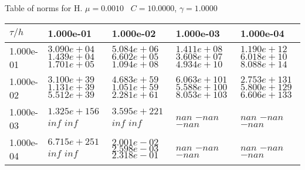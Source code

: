 \begin{center}
Table of norms for H. $\mu = 0.0010$ \, $C = 10.0000$, $\gamma = 1.0000$
  
\begin{tabular}{|p{1in}|p{1in}|p{1in}|p{1in}|p{1in}|} \hline
$\tau / h$ &1.000e-01 &1.000e-02 &1.000e-03 &1.000e-04 \\ \hline 
1.000e-01 & $3.090e+04$  $1.439e+04$  $1.701e+05$  & $5.084e+06$  $6.602e+05$  $1.094e+08$  & $1.411e+08$  $3.608e+07$  $4.934e+10$  & $1.190e+12$  $6.018e+10$  $8.088e+14$  \\ \hline 
1.000e-02 & $3.100e+39$  $1.131e+39$  $5.512e+39$  & $4.683e+59$  $1.051e+59$  $2.281e+61$  & $6.063e+101$  $5.588e+100$  $8.053e+103$  & $2.753e+131$  $5.800e+129$  $6.606e+133$  \\ \hline 
1.000e-03 & $1.325e+156$  $inf$  $inf$  & $3.595e+221$  $inf$  $inf$  & $nan$  $-nan$  $-nan$  & $nan$  $-nan$  $-nan$  \\ \hline 
1.000e-04 & $6.715e+251$  $inf$  $inf$  & $2.001e-02$  $2.598e-03$  $2.318e-01$  & $nan$  $-nan$  $-nan$  & $nan$  $-nan$  $-nan$  \\ \hline 

\end{tabular}\\[20pt]
\end{center}
